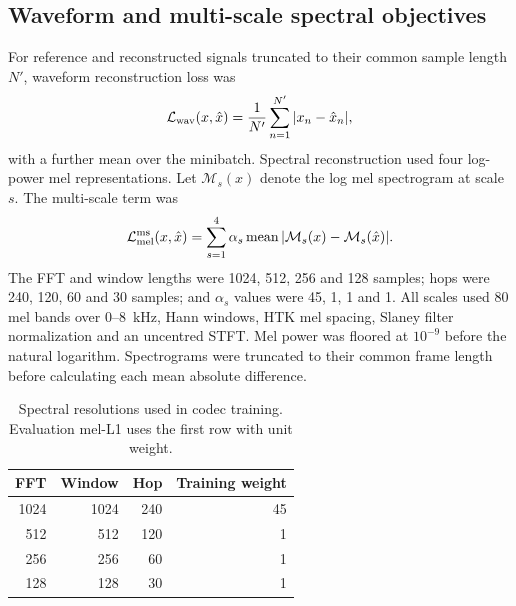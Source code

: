 \subsection{Waveform and multi-scale spectral objectives}
For reference and reconstructed signals truncated to their common sample length $N'$, waveform reconstruction loss was
\begin{equation}
 \mathcal L_{\rm wav}(x,\hat x)
 =\frac{1}{N'}\sum_{n=1}^{N'}|x_n-\hat x_n|,
 \label{eq:sv2-wav}
\end{equation}
with a further mean over the minibatch. Spectral reconstruction used four log-power mel representations. Let $\mathcal M_s(x)$ denote the log mel spectrogram at scale $s$. The multi-scale term was
\begin{equation}
 \mathcal L_{\rm mel}^{\rm ms}(x,\hat x)
 =\sum_{s=1}^{4}\alpha_s
     \operatorname{mean}|\mathcal M_s(x)-\mathcal M_s(\hat x)|.
 \label{eq:sv2-msmel}
\end{equation}
The FFT and window lengths were 1024, 512, 256 and 128 samples; hops were 240, 120, 60 and 30 samples; and $\alpha_s$ values were 45, 1, 1 and 1. All scales used 80 mel bands over 0--8~kHz, Hann windows, HTK mel spacing, Slaney filter normalization and an uncentred STFT. Mel power was floored at $10^{-9}$ before the natural logarithm. Spectrograms were truncated to their common frame length before calculating each mean absolute difference.

\begin{table}[t]
\centering
\caption{Spectral resolutions used in codec training. Evaluation mel-L1 uses the first row with unit weight.}
\label{tab:sv2-mels}
\small
\begin{tabular}{@{}rrrr@{}}
\toprule
FFT & Window & Hop & Training weight\\
\midrule
1024 & 1024 & 240 & 45\\
512 & 512 & 120 & 1\\
256 & 256 & 60 & 1\\
128 & 128 & 30 & 1\\
\bottomrule
\end{tabular}
\end{table}

